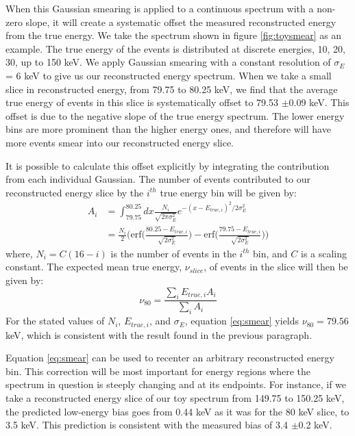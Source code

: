 When this Gaussian smearing is applied to a continuous spectrum with a non-zero slope, it will create a systematic offset the measured reconstructed energy from the true energy. We take the spectrum shown in figure \ref{fig:toysmear} as an example. The true energy of the events is distributed at discrete energies, 10, 20, 30, up to 150 keV. We apply Gaussian smearing with a constant resolution of $\sigma_{E}$= 6 keV to give us our reconstructed energy spectrum. When we take a small slice in reconstructed energy, from 79.75 to 80.25 keV, we find that the average true energy of events in this slice is systematically offset to 79.53 $\pm$0.09 keV. This offset is due to the negative slope of the true energy spectrum. The lower energy bins are more prominent than the higher energy ones, and therefore will have more events smear into our reconstructed energy slice.

It is possible to calculate this offset explicitly by integrating the contribution from each individual Gaussian. The number of events contributed to our reconstructed energy slice by the $i^{th}$ true energy bin will be given by:
\begin{equation}\label{eq:smear1}
\begin{split}
A_i&=\int_{79.75}^{80.25}dx\frac{N_i}{\sqrt{2\pi \sigma_{E}^{2}}} e^{-(x-E_{true,i})^2/2\sigma_{E}^{2}}\\
&=\frac{N_i}{2} \Bigg(\text{erf} \bigg(\frac{80.25-E_{true,i}}{\sqrt{2\sigma_E^2}}\bigg)-\text{erf} \bigg(\frac{79.75-E_{true,i}}{\sqrt{2\sigma_E^2}}\bigg)\Bigg)
\end{split}
\end{equation}
where, $N_i=C(16-i)$ is the number of events in the $i^{th}$ bin, and $C$ is a scaling constant. The expected mean true energy, $\nu_{slice}$, of events in the slice will then be given by:
\begin{equation}\label{eq:smear2}
\nu_{80}=\frac{\sum_i E_{true,i}A_i}{\sum_i A_i}
\end{equation}
For the stated values of $N_i$, $E_{true,i}$, and $\sigma_E$, equation \ref{eq:smear} yields $\nu_{80}=79.56$ keV, which is consistent with the result found in the previous paragraph.  

Equation \ref{eq:smear} can be used to recenter an arbitrary reconstructed energy bin. This correction will be most important for energy regions where the spectrum in question is steeply changing and at its endpoints. For instance, if we take a reconstructed energy slice of our toy spectrum from 149.75 to 150.25 keV, the predicted low-energy bias goes from 0.44 keV as it was for the 80 keV slice, to 3.5 keV. This prediction is consistent with the measured bias of 3.4 $\pm$0.2 keV.

